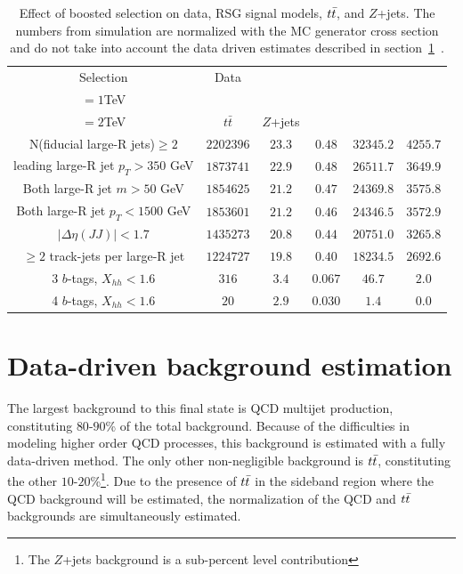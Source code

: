 \begin{table}[h!]
\centering
\captionsetup{justification=centering}

\hspace{-10pt}
\begin{tabular}{c|c|c|c|c|c}
Selection & Data & \specialcell{$m_{\Gkk}$ \\ $=1$TeV} & \specialcell{$m_{\Gkk}$\\ $=2$TeV} & $t\bar{t}$ & $Z$+jets \\
\hline
N(fiducial large-R jets)$\geq 2$ & $2202396$ & $23.3$ & $0.48$ & $32345.2$ & $4255.7$ \\
leading large-R jet $p_{T}>350$ GeV & $1873741$ & $22.9$ & $0.48$ & $26511.7$ & $3649.9$ \\
Both large-R jet $m>50$ GeV & $1854625$ & $21.2$ & $0.47$ & $24369.8$ & $3575.8$ \\
Both large-R jet $p_{T}<1500$ GeV & $1853601$ & $21.2$ & $0.46$ & $24346.5$ & $3572.9$ \\
$|\Delta\eta(JJ)|<1.7$ & $1435273$ & $20.8$ & $0.44$ & $20751.0$ & $3265.8$ \\
$\geq 2$ track-jets per large-R jet & $1224727$ & $19.8$ & $0.40$ & $18234.5$ & $2692.6$ \\
\hline
3 $b$-tags, $X_{hh}<1.6$ & $316$ & $3.4$ & $0.067$ & $46.7$ & $2.0$ \\
\hline
4 $b$-tags, $X_{hh}<1.6$ & $20$ & $2.9$ & $0.030$ & $1.4$ & $0.0$ \\
\hline
\end{tabular}

\caption{
Effect of boosted selection on data, RSG signal models, $t\bar{t}$, and $Z$+jets. The numbers from simulation are normalized with the MC generator cross section and do not take into account the data driven estimates described in section~\ref{sec:dd4b}~\cite{Qi}.
}
\label{tab:4bcutflow}
\end{table}

\section{Data-driven background estimation}
\label{sec:dd4b}

The largest background to this final state is QCD multijet production, constituting $80$-$90$\% of the total background. Because of the difficulties in modeling higher order QCD processes, this background is estimated with a fully data-driven method. The only other non-negligible background is $t\bar{t}$, constituting the other $10$-$20$\%\footnote{The $Z$+jets background is a sub-percent level contribution}.  Due to the presence of $t\bar{t}$ in the sideband region where the QCD background will be estimated, the normalization of the QCD and $t\bar{t}$ backgrounds are simultaneously estimated. 

